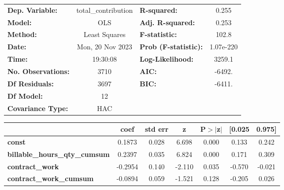 \begin{center}
\begin{tabular}{lclc}
\toprule
\textbf{Dep. Variable:}                     & total\_contribution & \textbf{  R-squared:         } &     0.255   \\
\textbf{Model:}                             &         OLS         & \textbf{  Adj. R-squared:    } &     0.253   \\
\textbf{Method:}                            &    Least Squares    & \textbf{  F-statistic:       } &     102.8   \\
\textbf{Date:}                              &   Mon, 20 Nov 2023  & \textbf{  Prob (F-statistic):} & 1.07e-220   \\
\textbf{Time:}                              &       19:30:08      & \textbf{  Log-Likelihood:    } &    3259.1   \\
\textbf{No. Observations:}                  &          3710       & \textbf{  AIC:               } &    -6492.   \\
\textbf{Df Residuals:}                      &          3697       & \textbf{  BIC:               } &    -6411.   \\
\textbf{Df Model:}                          &            12       & \textbf{                     } &             \\
\textbf{Covariance Type:}                   &         HAC         & \textbf{                     } &             \\
\bottomrule
\end{tabular}
\begin{tabular}{lcccccc}
                                            & \textbf{coef} & \textbf{std err} & \textbf{z} & \textbf{P$> |$z$|$} & \textbf{[0.025} & \textbf{0.975]}  \\
\midrule
\textbf{const}                              &       0.1873  &        0.028     &     6.698  &         0.000        &        0.133    &        0.242     \\
\textbf{billable\_hours\_qty\_cumsum}       &       0.2397  &        0.035     &     6.824  &         0.000        &        0.171    &        0.309     \\
\textbf{contract\_work}                     &      -0.2954  &        0.140     &    -2.110  &         0.035        &       -0.570    &       -0.021     \\
\textbf{contract\_work\_cumsum}             &      -0.0894  &        0.059     &    -1.521  &         0.128        &       -0.205    &        0.026     \\

\end{tabular}
\end{center}
